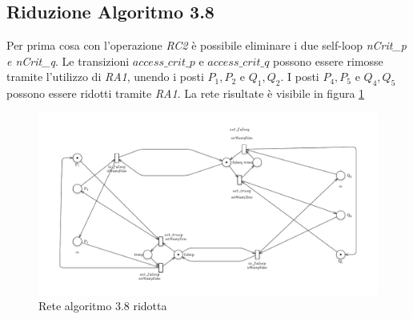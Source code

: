 \documentclass[a4paper]{article}
\begin{document}
\subsection{Riduzione Algoritmo 3.8}
Per prima cosa con l'operazione \textit{RC2} è possibile eliminare i due self-loop \textit{nCrit\_p \textit{e} nCrit\_q}.
Le transizioni $access\_crit\_p$ e $access\_crit\_q$ possono essere rimosse tramite l'utilizzo di \textit{RA1}, unendo i posti $P_1,P_2$ e $Q_1, Q_2$.
I posti $P_4,P_5$ e $Q_4,Q_5$ possono essere ridotti tramite \textit{RA1}.
La rete risultate è visibile in figura \ref{FIG:3.8Red}
\begin{figure}[!ht]
\centering
\includegraphics[width=1\textwidth]{3.8Red}
\caption{Rete algoritmo 3.8 ridotta} \label{FIG:3.8Red}
\end{figure}
\end{document}
